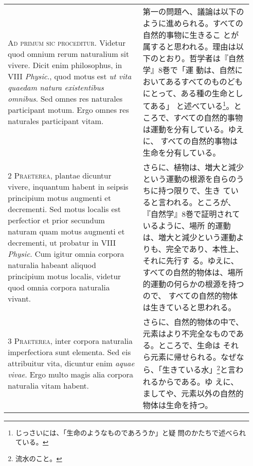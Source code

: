 \documentclass[10pt]{jsarticle} %
\begin{document}
\begin{longtable}{p{21em}p{21em}}

{\huge A}{\scshape d primum sic proceditur}. Videtur quod omnium rerum
 naturalium sit vivere. Dicit enim philosophus, in VIII {\itshape Physic}., quod
 motus est {\itshape ut vita quaedam natura existentibus omnibus}. Sed omnes res
 naturales participant motum. Ergo omnes res naturales participant
 vitam.
 
&

第一の問題へ、議論は以下のように進められる。すべての自然的事物に生きるこ
 とが属すると思われる。理由は以下のとおり。哲学者は『自然学』8巻で「運
 動は、自然においてあるすべてのものどもにとって、ある種の生命としてある」
 と述べている\footnote{じっさいには、「生命のようなものであろうか」と疑
 問のかたちで述べられている。}。ところで、すべての自然的事物は運動を分有している。ゆえに、
 すべての自然的事物は生命を分有している。


\\



{\scshape 2 Praeterea}, plantae dicuntur vivere, inquantum habent in
 seipsis principium motus augmenti et decrementi. Sed motus localis est
 perfectior et prior secundum naturam quam motus augmenti et decrementi,
 ut probatur in VIII {\itshape Physic}. Cum igitur omnia corpora naturalia habeant
 aliquod principium motus localis, videtur quod omnia corpora naturalia
 vivant.
 
&


さらに、植物は、増大と減少という運動の根源を自らのうちに持つ限りで、生き
 ていると言われる。ところが、『自然学』8巻で証明されているように、場所
 的運動は、増大と減少という運動よりも、完全であり、本性上、それに先行す
 る。ゆえに、すべての自然的物体は、場所的運動の何らかの根源を持つので、
 すべての自然的物体は生きていると思われる。

\\



{\scshape 3 Praeterea}, inter corpora naturalia imperfectiora sunt
 elementa. Sed eis attribuitur vita, dicuntur enim {\itshape aquae vivae}. Ergo
 multo magis alia corpora naturalia vitam habent.
 
&

さらに、自然的物体の中で、元素はより不完全なものである。ところで、生命は
 それら元素に帰せられる。なぜなら、「生きている水」\footnote{流水のこと。}と言われるからである。ゆ
 えに、ましてや、元素以外の自然的物体は生命を持つ。


\end{longtable}
\end{document}
